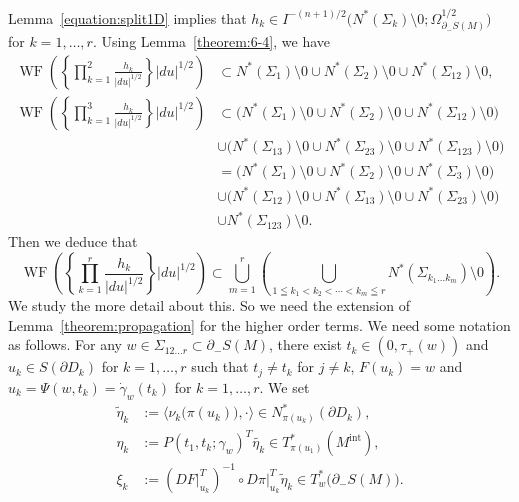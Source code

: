 \documentclass[a4paper,11pt,reqno]{amsart}
\numberwithin{equation}{section}
\theoremstyle{definition}
\theoremstyle{remark}
\begin{document}
%
% 
Lemma~\ref{equation:split1D} implies that 
$h_k \in I^{-(n+1)/2}\bigl(N^\ast(\Sigma_k)\setminus0;\Omega_{\partial_-S(M)}^{1/2}\bigr)$ 
for $k=1,\dotsc,r$. 
Using Lemma~\ref{theorem:6-4}, we have 
%
%
\begin{align*}
  \operatorname{WF}\left(
  \left\{\prod_{k=1}^2\frac{h_k}{\lvert{du}\rvert^{1/2}}\right\}
  \lvert{du}\rvert^{1/2}
  \right)
& \subset 
  N^\ast(\Sigma_1)\setminus0 
  \cup 
  N^\ast(\Sigma_2)\setminus0 
  \cup 
  N^\ast(\Sigma_{12})\setminus0,
\\
  \operatorname{WF}\left(
  \left\{\prod_{k=1}^3\frac{h_k}{\lvert{du}\rvert^{1/2}}\right\}
  \lvert{du}\rvert^{1/2}
  \right)
& \subset 
  \bigl(
  N^\ast(\Sigma_1)\setminus0 
  \cup 
  N^\ast(\Sigma_2)\setminus0 
  \cup 
  N^\ast(\Sigma_{12})\setminus0
  \bigr)
\\
& \cup
  \bigl(
  N^\ast(\Sigma_{13})\setminus0 
  \cup 
  N^\ast(\Sigma_{23})\setminus0 
  \cup 
  N^\ast(\Sigma_{123})\setminus0
  \bigr)
\\
& =
  \bigl(
  N^\ast(\Sigma_1)\setminus0 
  \cup 
  N^\ast(\Sigma_2)\setminus0 
  \cup 
  N^\ast(\Sigma_3)\setminus0
  \bigr)
\\
& \cup
  \bigl(
  N^\ast(\Sigma_{12})\setminus0 
  \cup 
  N^\ast(\Sigma_{13})\setminus0 
  \cup 
  N^\ast(\Sigma_{23})\setminus0
  \bigr)
\\
& \cup
  N^\ast(\Sigma_{123})\setminus0.
\end{align*}
%
%
Then we deduce that 
%
%
$$
\operatorname{WF}\left(
\left\{\prod_{k=1}^r\frac{h_k}{\lvert{du}\rvert^{1/2}}\right\}
\lvert{du}\rvert^{1/2}
\right)
\subset
\bigcup_{m=1}^r
\left(
\bigcup_{1 \leqq k_1 < k_2 < \dotsb <k_m \leqq r}
N^\ast(\Sigma_{k_1 \dotsc k_m})\setminus0
\right). 
$$
%
% 
We study the more detail about this. 
So we need the extension of Lemma~\ref{theorem:propagation} for the higher order terms. 
We need some notation as follows. 
For any $w \in \Sigma_{12{\dotsc}r} \subset \partial_-S(M)$, 
there exist $t_k \in (0,\tau_+(w))$ and $u_k \in S(\partial{D_k})$ for $k=1,\dotsc, r$ such that 
$t_j{\ne}t_k$ for $j{\ne}k$, 
$F(u_k)=w$ and $u_k=\Psi(w,t_k)=\dot{\gamma}_w(t_k)$ for $k=1,\dotsc, r$. 
We set 
%
%
\begin{align*}
  \tilde{\eta}_k
& :=
  \bigl\langle\nu_k\bigl(\pi(u_k)\bigr),\cdot\bigr\rangle
  \in
  N^\ast_{\pi(u_k)}(\partial{D_k}), 
\\
  \eta_k
& :=
  P(t_1,t_k;\gamma_w)^T\tilde{\eta_k}
  \in
  T^\ast_{\pi(u_1)}(M^\text{int}),
\\
  \xi_k
& :=
  (DF\vert^T_{u_k})^{-1}
  \circ
  D\pi\vert^T_{u_k}
  \tilde{\eta}_k
  \in
  T^\ast_w\bigl(\partial_-S(M)\bigr). 
\end{align*}
\end{document}
